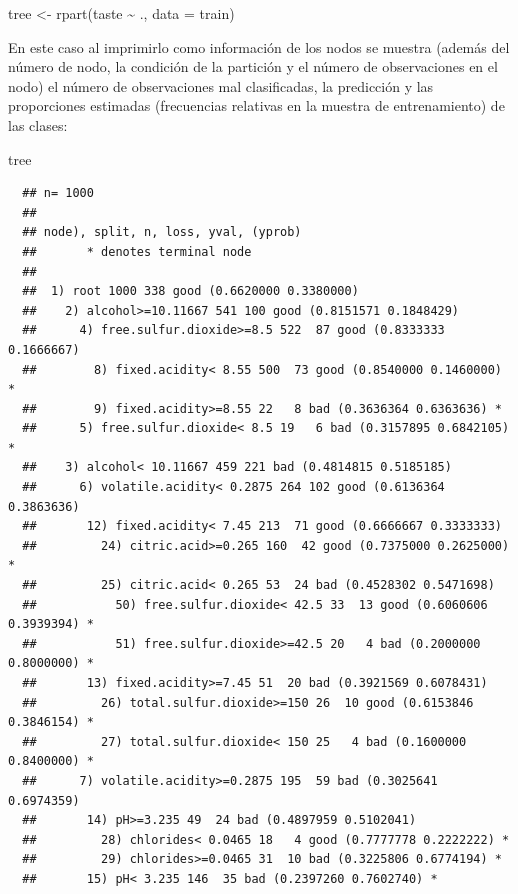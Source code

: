 \documentclass[
]{book}
\newenvironment{Shaded}{\begin{snugshade}}{\end{snugshade}}
\newcommand{\AttributeTok}[1]{\textcolor[rgb]{0.77,0.63,0.00}{#1}}
\newcommand{\FunctionTok}[1]{\textcolor[rgb]{0.00,0.00,0.00}{#1}}
\newcommand{\NormalTok}[1]{#1}
\newcommand{\OtherTok}[1]{\textcolor[rgb]{0.56,0.35,0.01}{#1}}
\newcommand{\SpecialCharTok}[1]{\textcolor[rgb]{0.00,0.00,0.00}{#1}}
\theoremstyle{break}
\theoremstyle{nonumberplain}
\begin{document}
\begin{Shaded}
\begin{Highlighting}[]
\NormalTok{tree }\OtherTok{\textless{}{-}} \FunctionTok{rpart}\NormalTok{(taste }\SpecialCharTok{\textasciitilde{}}\NormalTok{ ., }\AttributeTok{data =}\NormalTok{ train)}
\end{Highlighting}
\end{Shaded}

En este caso al imprimirlo como información de los nodos se muestra (además del número de nodo, la condición de la partición y el número de observaciones en el nodo) el número de observaciones mal clasificadas, la predicción y las proporciones estimadas (frecuencias relativas en la muestra de entrenamiento) de las clases:

\begin{Shaded}
\begin{Highlighting}[]
\NormalTok{tree}
\end{Highlighting}
\end{Shaded}

\begin{verbatim}
  ## n= 1000 
  ## 
  ## node), split, n, loss, yval, (yprob)
  ##       * denotes terminal node
  ## 
  ##  1) root 1000 338 good (0.6620000 0.3380000)  
  ##    2) alcohol>=10.11667 541 100 good (0.8151571 0.1848429)  
  ##      4) free.sulfur.dioxide>=8.5 522  87 good (0.8333333 0.1666667)  
  ##        8) fixed.acidity< 8.55 500  73 good (0.8540000 0.1460000) *
  ##        9) fixed.acidity>=8.55 22   8 bad (0.3636364 0.6363636) *
  ##      5) free.sulfur.dioxide< 8.5 19   6 bad (0.3157895 0.6842105) *
  ##    3) alcohol< 10.11667 459 221 bad (0.4814815 0.5185185)  
  ##      6) volatile.acidity< 0.2875 264 102 good (0.6136364 0.3863636)  
  ##       12) fixed.acidity< 7.45 213  71 good (0.6666667 0.3333333)  
  ##         24) citric.acid>=0.265 160  42 good (0.7375000 0.2625000) *
  ##         25) citric.acid< 0.265 53  24 bad (0.4528302 0.5471698)  
  ##           50) free.sulfur.dioxide< 42.5 33  13 good (0.6060606 0.3939394) *
  ##           51) free.sulfur.dioxide>=42.5 20   4 bad (0.2000000 0.8000000) *
  ##       13) fixed.acidity>=7.45 51  20 bad (0.3921569 0.6078431)  
  ##         26) total.sulfur.dioxide>=150 26  10 good (0.6153846 0.3846154) *
  ##         27) total.sulfur.dioxide< 150 25   4 bad (0.1600000 0.8400000) *
  ##      7) volatile.acidity>=0.2875 195  59 bad (0.3025641 0.6974359)  
  ##       14) pH>=3.235 49  24 bad (0.4897959 0.5102041)  
  ##         28) chlorides< 0.0465 18   4 good (0.7777778 0.2222222) *
  ##         29) chlorides>=0.0465 31  10 bad (0.3225806 0.6774194) *
  ##       15) pH< 3.235 146  35 bad (0.2397260 0.7602740) *
\end{verbatim}
\end{document}

